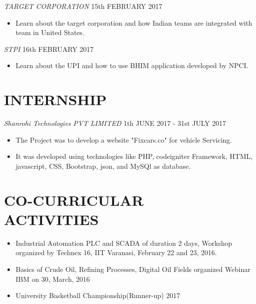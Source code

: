 \documentclass[margin, ]{res} %
\begin{document}
\begin{resume}
{\sl TARGET CORPORATION} \hfill 15th FEBRUARY 2017

\begin{itemize}
\item Learn about the target corporation and how Indian teams are integrated with team in United States.
\end{itemize} 
{\sl STPI} \hfill 16th FEBRUARY 2017

\begin{itemize}
\item Learn about the UPI and how to use BHIM application developed by NPCI.
\end{itemize} 

\section{INTERNSHIP}

{\sl Shanrohi Technologies PVT LIMITED} \hfill 1th JUNE 2017 - 31st JULY 2017

\begin{itemize}
\item The Project was to develop a website "Fixcars.co" for vehicle Servicing.
\item It was developed using technologies like PHP, codeigniter Framework, HTML, javascript, CSS, Bootstrap, json, and MySQl as database.
\end{itemize} 




\section{CO-CURRICULAR \\ ACTIVITIES} 
\begin{itemize}

\item Industrial Automation PLC and SCADA of duration 2 days, Workshop organized by Technex 16, IIT Varanasi, February 22 and 23, 2016.

\item Basics of Crude Oil, Refining Processes, Digital Oil Fields organized Webinar IBM on 30, March, 2016

\item University Basketball Championship(Runner-up) 2017

\end{itemize}
 


\end{resume}
\end{document}
